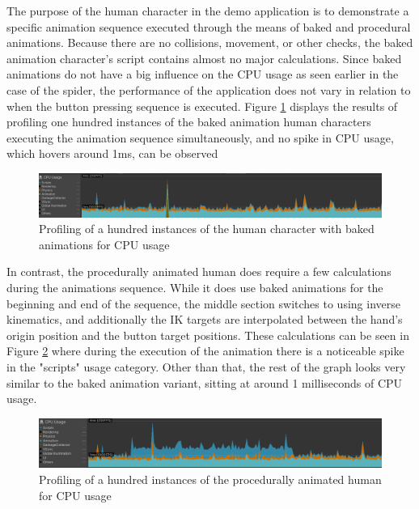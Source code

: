 The purpose of the human character in the demo application is to demonstrate
a specific animation sequence executed through the means of baked and procedural
animations. Because there are no collisions, movement, or other checks, the baked
animation character's script contains almost no major calculations. Since
baked animations do not have a big influence on the CPU usage as seen earlier in
the case of the spider, the performance of the application does not vary in
relation to when the button pressing sequence is executed. Figure
\ref{fig:pr_h_b} displays the results of profiling one hundred instances of the
baked animation human characters executing the animation sequence
simultaneously, and no spike in CPU usage, which hovers around 1ms, can be
observed

\begin{figure}[h!]
    \centering
    \captionsetup{justification=centering}
    \includegraphics[width=\textwidth]{grafika/pr_h_b.png}
    \caption{Profiling of a hundred instances of the human character with baked
    animations for CPU usage}
    \label{fig:pr_h_b}
\end{figure}

In contrast, the procedurally animated human does require a few calculations
during the animations sequence. While it does use baked animations for the
beginning and end of the sequence, the middle section switches to using inverse
kinematics, and additionally the IK targets are interpolated between the hand's
origin position and the button target positions. These calculations can be
seen in Figure \ref{fig:pr_h_ik} where during the execution of the animation
there is a noticeable spike in the "scripts" usage category. Other than that,
the rest of the graph looks very similar to the baked animation variant, sitting
at around 1 milliseconds of CPU usage.

\begin{figure}[h!]
    \centering
    \captionsetup{justification=centering}
    \includegraphics[width=\textwidth]{grafika/pr_h_ik.png}
    \caption{Profiling of a hundred instances of the procedurally animated human
    for CPU usage}
    \label{fig:pr_h_ik}
\end{figure}


